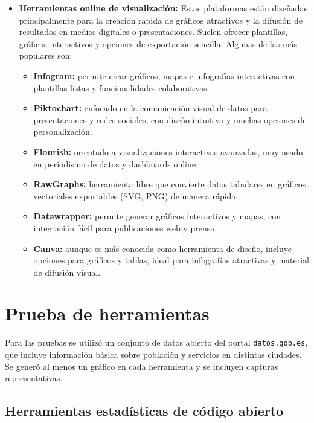 \documentclass{../../miPlantilla}
\begin{document}
\begin{itemize}
    \item \textbf{Herramientas online de visualización:}  
    Estas plataformas están diseñadas principalmente para la creación rápida de gráficos atractivos y la difusión de resultados
    en medios digitales o presentaciones. Suelen ofrecer plantillas, gráficos interactivos y opciones de exportación sencilla.
    Algunas de las más populares son:  
    \begin{itemize}
        \item \textbf{Infogram:} permite crear gráficos, mapas e infografías interactivas con plantillas listas y
        funcionalidades colaborativas.  
        \item \textbf{Piktochart:} enfocado en la comunicación visual de datos para presentaciones y redes sociales,
        con diseño intuitivo y muchas opciones de personalización.  
        \item \textbf{Flourish:} orientado a visualizaciones interactivas avanzadas, muy usado en periodismo de datos
        y dashboards online.  
        \item \textbf{RawGraphs:} herramienta libre que convierte datos tabulares en gráficos vectoriales exportables
        (SVG, PNG) de manera rápida.  
        \item \textbf{Datawrapper:} permite generar gráficos interactivos y mapas, con integración fácil para
        publicaciones web y prensa.  
        \item \textbf{Canva:} aunque es más conocida como herramienta de diseño, incluye opciones para gráficos y
        tablas, ideal para infografías atractivas y material de difusión visual.
    \end{itemize}
\end{itemize}

\newpage

\section{Prueba de herramientas}

Para las pruebas se utilizó un conjunto de datos abierto del portal \texttt{datos.gob.es}, que incluye información
básica sobre población y servicios en distintas ciudades. Se generó al menos un gráfico en cada herramienta y se
incluyen capturas representativas.

\subsection{Herramientas estadísticas de código abierto}
\end{document}
